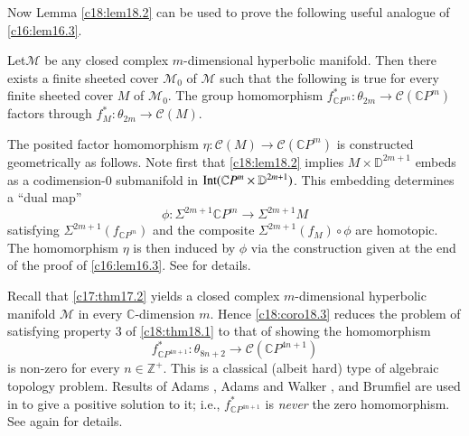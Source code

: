 Now Lemma \ref{c18:lem18.2} can be used to prove the following useful
analogue of \ref{c16:lem16.3}.

\begin{coro}\label{c18:coro18.3}
Let\pageoriginale $\mathcal{M}$ be any closed complex $m$-dimensional
hyperbolic manifold. Then there exists a finite sheeted cover
$\mathcal{M}_{0}$ of $\mathcal{M}$ such that the following is true for
every finite sheeted cover $M$ of $\mathcal{M}_{0}$. The group
homomorphism $f^{*}_{\mathbb{C}P^{m}}:\theta_{2m}\to
\mathcal{C}(\mathbb{C}P^{m})$ factors through
$f^{*}_{M}:\theta_{2m}\to \mathcal{C}(M)$.
\end{coro}

The posited factor homomorphism $\eta:\mathcal{C}(M)\to
\mathcal{C}(\mathbb{C}P^{m})$ is constructed geometrically as
follows. Note first that \ref{c18:lem18.2} implies $M\times
\mathbb{D}^{2m+1}$ embeds as a codimension-0 submanifold in
$\operatorname{Int}(\mathbb{C}P^{m}\times \mathbb{D}^{2m+1})$. This embedding
determines a ``dual map''
$$
\phi:\Sigma^{2m+1}\mathbb{C}P^{m}\to \Sigma^{2m+1}M
$$
satisfying $\Sigma^{2m+1}(f_{\mathbb{C}P^{m}})$ and the composite
$\Sigma^{2m+1}(f_{M})\circ \phi$ are homotopic. The homomorphism
$\eta$ is then induced by $\phi$ via the construction given at the
end of the proof of \ref{c16:lem16.3}. See \cite[p. 70]{46} for details.

Recall that \ref{c17:thm17.2} yields a closed complex $m$-dimensional
hyperbolic manifold $\mathcal{M}$ in every $\mathbb{C}$-dimension
$m$. Hence \ref{c18:coro18.3} reduces the problem of satisfying
property 3 of \ref{c18:thm18.1} to that of showing the homomorphism
$$
f^{*}_{\mathbb{C}P^{4n+1}}:\theta_{8n+2}\to
\mathcal{C}(\mathbb{C}P^{4n+1})
$$
is non-zero for every $n\in \mathbb{Z}^{+}$. This is a classical
(albeit hard) type of algebraic topology problem. Results of Adams
\cite{1}, Adams and Walker \cite{2}, and Brumfiel \cite{15} are used
in \cite{46} to give a positive solution to it; i.e.,
$f^{*}_{\mathbb{C}P^{4n+1}}$ is {\em never} the zero homomorphism. See
again \cite{46} for details.


